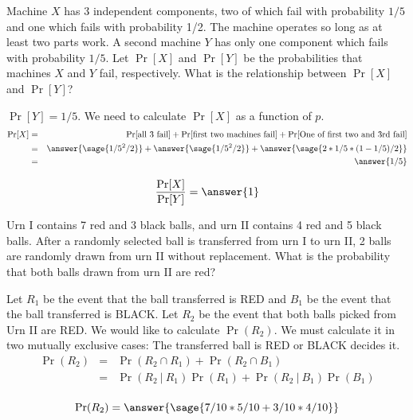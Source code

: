 \documentclass{ximera}
\begin{document}
\begin{problem}
Machine $X$ has 3 independent components, two of which fail with probability $1/5$ and one which fails with probability 1/2. The machine operates so long as at least two parts work. A second machine $Y$ has only one component which fails with probability $1/5$. Let $\Pr[X]$ and $\Pr[Y]$ be the probabilities that machines $X$ and $Y$ fail, respectively. What is the relationship between $\Pr[X]$ and $\Pr[Y]$? 

\begin{hint}
$\Pr[Y]=1/5$. We need to calculate $\Pr[X]$ as a function of $p$.
\begin{eqnarray*}
\Pr[X]&=&\Pr[\text{all 3 fail}]+\Pr[\text{first two machines fail}]+\Pr[\text{One of first two and 3rd fail}] \\
&=& \answer{\sage{1/5^2/2}}+\answer{\sage{1/5^2/2}}+\answer{\sage{2*1/5*(1-1/5)/2}} \\
&=& \answer{1/5}
\end{eqnarray*}
\end{hint}

\begin{prompt}
        $$\frac{\Pr[X]}{\Pr[Y]}=\answer{1} $$
\end{prompt}
\end{problem}

\begin{problem}
Urn I contains 7 red and 3 black balls, and urn II contains 4 red and 5 black balls. After a randomly selected ball is transferred from urn I to urn II, 2 balls are randomly drawn from urn II without replacement. What is the probability that both balls drawn from urn II are red? 
\begin{hint}
Let $R_1$ be the event that the ball transferred is RED and $B_1$ be the event that the ball transferred is BLACK. Let $R_2$ be the event that both balls picked from Urn II are RED. We would like to calculate $\Pr(R_2)$. We must calculate it in two mutually exclusive cases: The transferred ball is RED or BLACK decides it. 
\begin{eqnarray*} 
\Pr(R_2)
&=&\Pr(R_2\cap R_1)+\Pr(R_2\cap B_1) \\
&=&\Pr(R_2 ~|~ R_1)\Pr(R_1)+\Pr(R_2~|~ B_1)\Pr(B_1) \\
\end{eqnarray*} 
\end{hint}

\begin{prompt}
$$\Pr(R_2)=\answer{\sage{7/10*5/10+3/10*4/10}}
$$
\end{prompt}

\end{problem}
\end{document}
